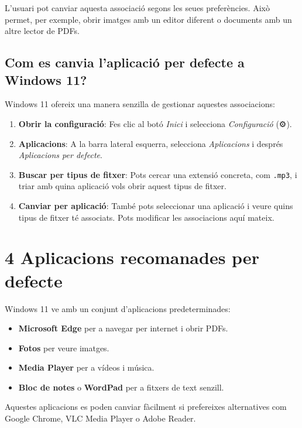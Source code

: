 \documentclass[
  a4paper,
]{article}
\providecommand{\tightlist}{%
  \setlength{\itemsep}{0pt}\setlength{\parskip}{0pt}}
\begin{document}
L'usuari pot canviar aquesta associació segons les seues preferències.
Això permet, per exemple, obrir imatges amb un editor diferent o
documents amb un altre lector de PDFs.

\subsection{Com es canvia l'aplicació per defecte a Windows
11?}\label{com-es-canvia-laplicaciuxf3-per-defecte-a-windows-11}

Windows 11 ofereix una manera senzilla de gestionar aquestes
associacions:

\begin{enumerate}
\def\labelenumi{\arabic{enumi}.}
\tightlist
\item
  \textbf{Obrir la configuració}: Fes clic al botó \emph{Inici} i
  selecciona \emph{Configuració} (⚙️).
\item
  \textbf{Aplicacions}: A la barra lateral esquerra, selecciona
  \emph{Aplicacions} i després \emph{Aplicacions per defecte}.
\item
  \textbf{Buscar per tipus de fitxer}: Pots cercar una extensió
  concreta, com \texttt{.mp3}, i triar amb quina aplicació vols obrir
  aquest tipus de fitxer.
\item
  \textbf{Canviar per aplicació}: També pots seleccionar una aplicació i
  veure quins tipus de fitxer té associats. Pots modificar les
  associacions aquí mateix.
\end{enumerate}

\section{4 Aplicacions recomanades per
defecte}\label{aplicacions-recomanades-per-defecte}

Windows 11 ve amb un conjunt d'aplicacions predeterminades:

\begin{itemize}
\tightlist
\item
  \textbf{Microsoft Edge} per a navegar per internet i obrir PDFs.
\item
  \textbf{Fotos} per veure imatges.
\item
  \textbf{Media Player} per a vídeos i música.
\item
  \textbf{Bloc de notes} o \textbf{WordPad} per a fitxers de text
  senzill.
\end{itemize}

Aquestes aplicacions es poden canviar fàcilment si prefereixes
alternatives com Google Chrome, VLC Media Player o Adobe Reader.
\end{document}
